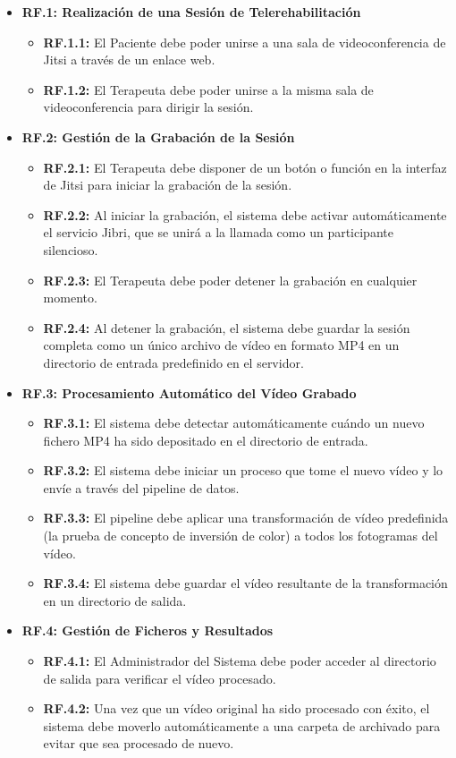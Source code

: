 \begin{itemize}
	\item \textbf{RF.1: Realización de una Sesión de Telerehabilitación}
	\begin{itemize}
	    \item \textbf{RF.1.1:} El Paciente debe poder unirse a una sala de videoconferencia de Jitsi a través de un enlace web.
	    \item \textbf{RF.1.2:} El Terapeuta debe poder unirse a la misma sala de videoconferencia para dirigir la sesión.
	\end{itemize}
	
	\item \textbf{RF.2: Gestión de la Grabación de la Sesión}
	\begin{itemize}
	    \item \textbf{RF.2.1:} El Terapeuta debe disponer de un botón o función en la interfaz de Jitsi para iniciar la grabación de la sesión.
	    \item \textbf{RF.2.2:} Al iniciar la grabación, el sistema debe activar automáticamente el servicio Jibri, que se unirá a la llamada como un participante silencioso.
	    \item \textbf{RF.2.3:} El Terapeuta debe poder detener la grabación en cualquier momento.
        \item \textbf{RF.2.4:} Al detener la grabación, el sistema debe guardar la sesión completa como un único archivo de vídeo en formato MP4 en un directorio de entrada predefinido en el servidor.
	\end{itemize}
	
	\item \textbf{RF.3: Procesamiento Automático del Vídeo Grabado}
	\begin{itemize}
	    \item \textbf{RF.3.1:} El sistema debe detectar automáticamente cuándo un nuevo fichero MP4 ha sido depositado en el directorio de entrada.
	    \item \textbf{RF.3.2:} El sistema debe iniciar un proceso que tome el nuevo vídeo y lo envíe a través del pipeline de datos.
	    \item \textbf{RF.3.3:} El pipeline debe aplicar una transformación de vídeo predefinida (la prueba de concepto de inversión de color) a todos los fotogramas del vídeo.
	    \item \textbf{RF.3.4:} El sistema debe guardar el vídeo resultante de la transformación en un directorio de salida.
	\end{itemize}
	
	\item \textbf{RF.4: Gestión de Ficheros y Resultados}
	\begin{itemize}
	    \item \textbf{RF.4.1:} El Administrador del Sistema debe poder acceder al directorio de salida para verificar el vídeo procesado.
	    \item \textbf{RF.4.2:} Una vez que un vídeo original ha sido procesado con éxito, el sistema debe moverlo automáticamente a una carpeta de archivado para evitar que sea procesado de nuevo.
	\end{itemize}
\end{itemize}


